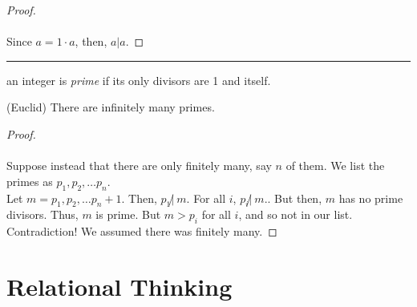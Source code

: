 \documentclass{article}
\def \proofDistance {5pt}
\newcommand{\proofseparator}{\par\noindent\rule{\textwidth}{0.4pt}}
\begin{document}
            \vspace{\proofDistance}

            \begin{proof}
                \mbox{}\\[-\baselineskip] \\
                Since $a = 1 \cdot a$, then, $a|a$.
            \end{proof}

            \proofseparator

            \begin{definition}
                an integer is \textit{prime} if its only divisors are 1 and itself.
            \end{definition}
            
\newpage


            \vspace{\proofDistance}

            \begin{theorem}
                (Euclid) There are infinitely many primes.
            \end{theorem}

            \vspace{\proofDistance}

            \begin{proof}
                \mbox{}\\[-\baselineskip] \\
                Suppose instead that there are only finitely many, say $n$ of them. We list the primes as $p_1, p_2,\dots p_n.$ \\
                \indent Let $m = p_1, p_2,\dots p_n + 1$. Then, $p_1 \! \not | \ m.$ For all $i$, $p_i \! \not | \ m.$. But then, $m$ has no prime divisors. Thus, $m$ is prime. But $m > p_i$ for all $i$, and so not in our list. \\
                \indent Contradiction! We assumed there was finitely many.
            \end{proof}
            
\newpage


\section{Relational Thinking}
\end{document}
